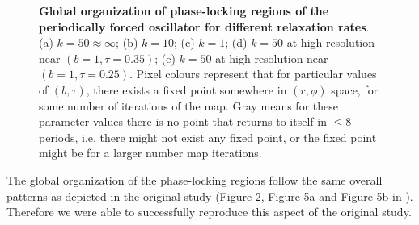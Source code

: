 \begin{figure}[tbph]
    \hfil
    
\caption{\textbf{Global organization of phase-locking regions of the periodically forced oscillator for different relaxation rates}. (a) $k = 50 \approx \infty$; (b) $k = 10$; (c) $k = 1$; (d) $k = 50$ at high resolution near $(b=1,\tau=0.35)$; (e) $k = 50$ at high resolution near $(b=1,\tau=0.25)$. Pixel colours represent that for particular values of $(b,\tau)$, there exists a fixed point somewhere in $(r,\phi)$ space, for some number of iterations of the map. Gray means for these parameter values there is no point that returns to itself in $\leq8$ periods, i.e. there might not exist any fixed point, or the fixed point might be for a larger number map iterations.}
    \label{replic}
\end{figure}

The global organization of the phase-locking regions follow the same overall patterns as depicted in the original study (Figure 2, Figure 5a and Figure 5b in \supercite{GLASS1994}). Therefore we were able to successfully reproduce this aspect of the original study.

